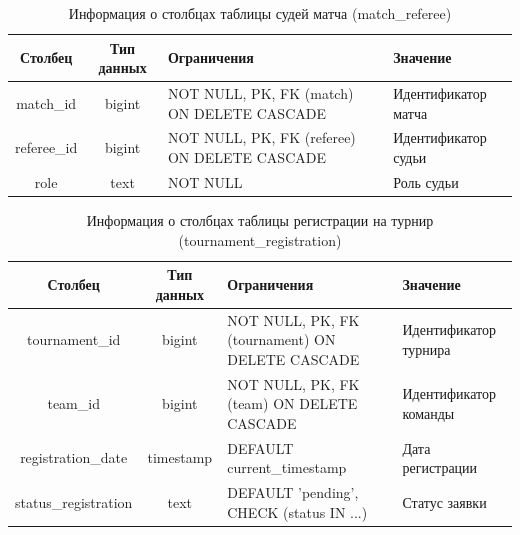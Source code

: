 \begin{table}[H]
	\begin{center}
		\caption{Информация о столбцах таблицы судей матча (match\_referee)}
		\begin{tabular}{|c|c|>{\centering\arraybackslash}m{5cm}|>{\centering\arraybackslash}m{3.5cm}|}
			\hline
			Столбец & Тип данных & Ограничения & Значение \\
			\hline
			match\_id & bigint & NOT NULL, PK, FK (match) ON DELETE CASCADE & Идентификатор матча \\
			\hline
			referee\_id & bigint & NOT NULL, PK, FK (referee) ON DELETE CASCADE & Идентификатор судьи \\
			\hline
			role & text & NOT NULL & Роль судьи \\
			\hline
		\end{tabular}
		\label{table:db:match_referee}
	\end{center}
\end{table}

\begin{table}[H]
	\begin{center}
		\caption{Информация о столбцах таблицы регистрации на турнир (tournament\_registration)}
		\begin{tabular}{|c|c|>{\centering\arraybackslash}m{5cm}|>{\centering\arraybackslash}m{3.5cm}|}
			\hline
			Столбец & Тип данных & Ограничения & Значение \\
			\hline
			tournament\_id & bigint & NOT NULL, PK, FK (tournament) ON DELETE CASCADE & Идентификатор турнира \\
			\hline
			team\_id & bigint & NOT NULL, PK, FK (team) ON DELETE CASCADE & Идентификатор команды \\
			\hline
			registration\_date & timestamp & DEFAULT current\_timestamp & Дата регистрации \\
			\hline
			status\_registration & text & DEFAULT 'pending', CHECK (status IN ...) & Статус заявки \\
			\hline
		\end{tabular}
		\label{table:db:tournament_registration}
	\end{center}
\end{table}

